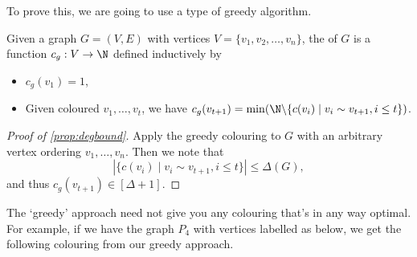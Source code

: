 \documentclass[a4paper]{scrartcl}
\begin{document}
To prove this, we are going to use a type of greedy algorithm.

\begin{definition}
	Given a graph $G = (V, E)$ with vertices $V = \{v_1, v_2, \dots, v_n\}$, the  of $G$ is a function $c_g: V\rightarrow \N$ defined inductively by
	\begin{itemize}
		\item $c_g(v_1) = 1$,
		\item Given coloured $v_1, \dots, v_t$, we have $c_g(v_{t + 1}) = \min(\N\backslash \{c(v_i) \mid v_i \sim v_{t + 1}, i \leq t\})$.
	\end{itemize}
\end{definition}

\begin{proof}[Proof of \autoref{prop:degbound}]
	Apply the greedy colouring to $G$ with an arbitrary vertex ordering $v_1, \dots, v_n$. Then we note that
	$$
	|\{c(v_i) \mid v_i \sim v_{t + 1}, i \leq t\}| \leq \Delta(G),
	$$
	and thus $c_g(v_{t + 1}) \in [\Delta + 1]$.
\end{proof}

The `greedy' approach need not give you any colouring that's in any way optimal. For example, if we have the graph $P_4$ with vertices labelled as below, we get the following colouring from our greedy approach.
\end{document}
